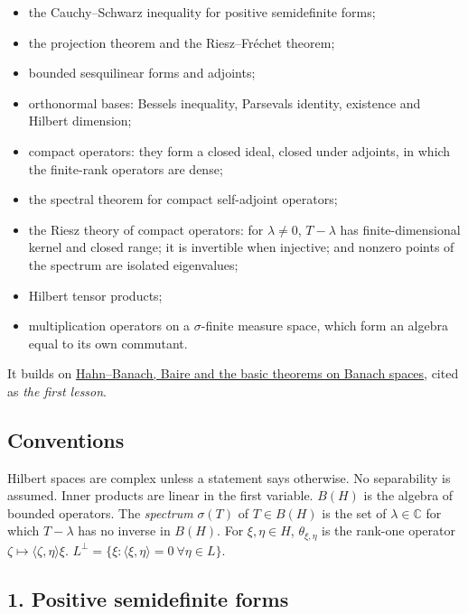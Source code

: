 \documentclass[
  english,
  11pt,
  a4paper,
]{article}
\providecommand{\tightlist}{%
  \setlength{\itemsep}{0pt}\setlength{\parskip}{0pt}}
\begin{document}
\begin{itemize}
\tightlist
\item
  the Cauchy--Schwarz inequality for positive semidefinite forms;
\item
  the projection theorem and the Riesz--Fréchet theorem;
\item
  bounded sesquilinear forms and adjoints;
\item
  orthonormal bases: Bessel\textquotesingle s inequality,
  Parseval\textquotesingle s identity, existence and Hilbert dimension;
\item
  compact operators: they form a closed ideal, closed under adjoints, in
  which the finite-rank operators are dense;
\item
  the spectral theorem for compact self-adjoint operators;
\item
  the Riesz theory of compact operators: for \(\lambda\ne0\),
  \(T-\lambda\) has finite-dimensional kernel and closed range; it is
  invertible when injective; and nonzero points of the spectrum are
  isolated eigenvalues;
\item
  Hilbert tensor products;
\item
  multiplication operators on a \(\sigma\)-finite measure space, which
  form an algebra equal to its own commutant.
\end{itemize}

It builds on
\href{https://kokunoyumeto.github.io/open-math-courses/courses/harmonic-analysis-on-locally-compact-groups/reader/programme-reading.html\#ref-5bc8dc4283ec5f38}{Hahn--Banach,
Baire and the basic theorems on Banach spaces}, cited as \emph{the first
lesson}.

\subsection{Conventions}\label{hilbert-spaces-and-compact-operators--conventions}

Hilbert spaces are complex unless a statement says otherwise. No
separability is assumed. Inner products are linear in the first
variable. \(B(H)\) is the algebra of bounded operators. The
\emph{spectrum} \(\sigma(T)\) of \(T\in B(H)\) is the set of
\(\lambda\in\mathbb C\) for which \(T-\lambda\) has no inverse in
\(B(H)\). For \(\xi,\eta\in H\), \(\theta_{\xi,\eta}\) is the rank-one
operator \(\zeta\mapsto\langle\zeta,\eta\rangle\xi\).
\(L^\perp=\{\xi:\langle\xi,\eta\rangle=0\ \forall\eta\in L\}\).

\subsection[1. Positive semidefinite
forms]{\texorpdfstring{\protect\hypertarget{hilbert-spaces-and-compact-operators--oa-fnd-hs-01}{}{}1.
Positive semidefinite
forms}{1. Positive semidefinite forms}}\label{hilbert-spaces-and-compact-operators--OA-FND-HS-01}
\end{document}
